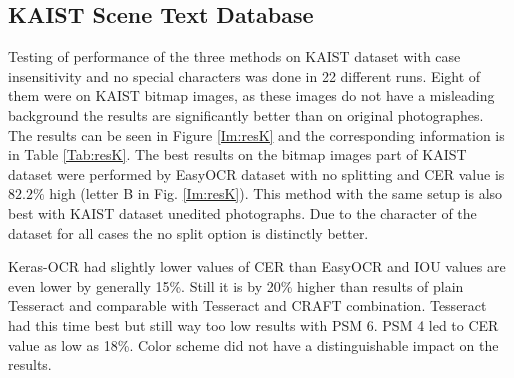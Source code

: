 \subsection*{KAIST Scene Text Database}

Testing of performance of the three methods on KAIST dataset with case insensitivity and no special characters was done in 22 different runs. Eight of them were on KAIST bitmap images, as these images do not have a misleading background the results are significantly better than on original photographes. The results can be seen in Figure \ref*{Im:resK} and the corresponding information is in Table \ref*{Tab:resK}. 
The best results on the bitmap images part of KAIST dataset were performed by EasyOCR dataset with no splitting and CER value is $82.2\%$ high (letter B in Fig. \ref*{Im:resK}). This method with the same setup is also best with KAIST dataset unedited photographs. Due to the character of the dataset for all cases the no split option is distinctly better. 

Keras-OCR had slightly lower values of CER than EasyOCR and IOU values are even lower by generally 15\%. Still it is by 20\% higher than results of plain Tesseract and comparable with Tesseract and CRAFT combination. Tesseract had this time best but still way too low results with PSM 6. PSM 4 led to CER value as low as 18\%. Color scheme did not have a distinguishable impact on the results.
 
